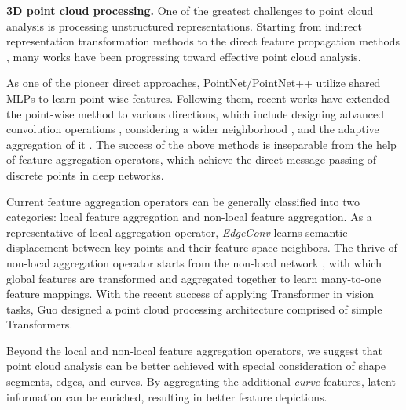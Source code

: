 \documentclass[10pt,twocolumn,letterpaper]{article}
\theoremstyle{definition}
\begin{document}
\noindent
\textbf{3D point cloud processing.} One of the greatest challenges to point cloud analysis is processing unstructured representations. Starting from indirect representation transformation methods \cite{li2016fpnn, klokov2017escape, riegler2017octnet, lei2019octree} to the direct feature propagation methods \cite{qi2017pointnet,zhang2020shape,hu2020randla}, many works have been progressing toward effective point cloud analysis.

As one of the pioneer direct approaches, PointNet/PointNet++ \cite{qi2017pointnet, qi2017pointnet++} utilize shared MLPs to learn point-wise features. Following them, recent works have extended the point-wise method to various directions, which include designing advanced convolution operations \cite{komarichev2019cnn, xu2020grid, wu2019pointconv, liu2019relation}, considering a wider neighborhood \cite{li2018so, zhao2019pointweb, wang2019dynamic, liu2019lpd}, and the adaptive aggregation of it \cite{hu2020randla, yan2020pointasnl, zhang2019pcan, yang2019modeling}. The success of the above methods is inseparable from the help of feature aggregation operators, which achieve the direct message passing of discrete points in deep networks.

Current feature aggregation operators can be generally classified into two categories: local feature aggregation and non-local feature aggregation. As a representative of local aggregation operator, \textit{EdgeConv} \cite{wang2019dynamic} learns semantic displacement between key points and their feature-space neighbors. The thrive of non-local aggregation operator starts from the non-local network \cite{wang2018non}, with which global features are transformed and aggregated together to learn many-to-one feature mappings. With the recent success of applying Transformer \cite{vaswani2017attention} in vision tasks, Guo \etal \cite{guo2020pct} designed a point cloud processing architecture comprised of simple Transformers. 









Beyond the local and non-local feature aggregation operators, we suggest that point cloud analysis can be better achieved with special consideration of shape segments, edges, and curves. By aggregating the additional \textit{curve} features, latent information can be enriched, resulting in better feature depictions. 
\end{document}

